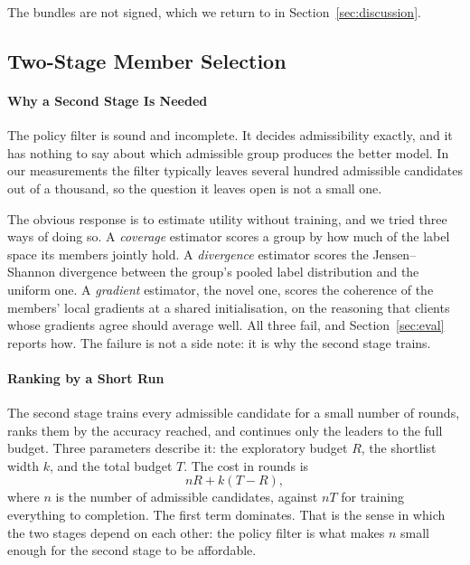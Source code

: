 \documentclass[10pt,conference]{IEEEtran}
\begin{document}
The bundles are not signed, which we return to in
Section~\ref{sec:discussion}.

\subsection{Two-Stage Member Selection}
\label{sec:twostage}

\paragraph{Why a Second Stage Is Needed}

The policy filter is sound and incomplete. It decides admissibility exactly, and
it has nothing to say about which admissible group produces the better model. In
our measurements the filter typically leaves several hundred admissible
candidates out of a thousand, so the question it leaves open is not a small one.

The obvious response is to estimate utility without training, and we tried
three ways of doing so. A \emph{coverage} estimator scores a group by how much
of the label space its members jointly hold. A \emph{divergence} estimator
scores the Jensen--Shannon divergence between the group's pooled label
distribution and the uniform one. A \emph{gradient} estimator, the novel one, scores the coherence of the members' local gradients at a shared
initialisation, on the reasoning that clients whose gradients agree should
average well. All three fail, and Section~\ref{sec:eval} reports how. The
failure is not a side note: it is why the second stage trains.

\paragraph{Ranking by a Short Run}

The second stage trains every admissible candidate for a small number of rounds,
ranks them by the accuracy reached, and continues only the leaders to the full
budget. Three parameters describe it: the exploratory budget $R$, the shortlist
width $k$, and the total budget $T$. The cost in rounds is
\[
n R + k (T - R),
\]
where $n$ is the number of admissible candidates, against $nT$ for training
everything to completion. The first term dominates. That is the sense in which
the two stages depend on each other: the policy filter is what makes $n$ small
enough for the second stage to be affordable.
\end{document}
